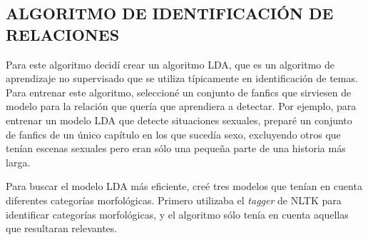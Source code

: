 \documentclass{pre-tfg}
\begin{document}




\subsection{ALGORITMO DE IDENTIFICACIÓN DE RELACIONES}

Para este algoritmo decidí crear un algoritmo LDA, que es un algoritmo de aprendizaje no supervisado que se utiliza típicamente en identificación de temas. Para entrenar este algoritmo, seleccioné un conjunto de fanfics que sirviesen de modelo para la relación que quería que aprendiera a detectar. Por ejemplo, para entrenar un modelo LDA que detecte situaciones sexuales, preparé un conjunto de fanfics de un único capítulo en los que sucedía sexo, excluyendo otros que tenían escenas sexuales pero eran sólo una pequeña parte de una historia más larga. 

Para buscar el modelo LDA más eficiente, creé tres modelos que tenían en cuenta diferentes categorías morfológicas. Primero utilizaba el \textit{tagger} de NLTK para identificar categorías morfológicas, y el algoritmo sólo tenía en cuenta aquellas que resultaran relevantes.
\end{document}
